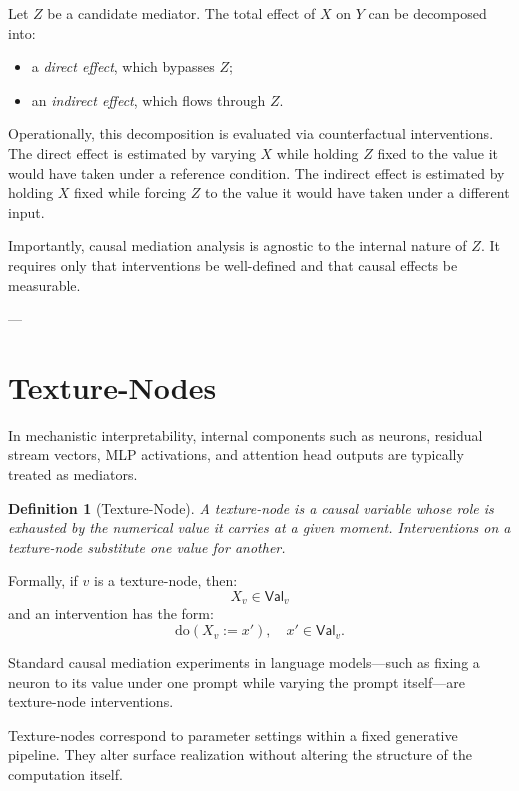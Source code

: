\documentclass[11pt]{article}
\newtheorem{definition}{Definition}
\theoremstyle{remark}
\newcommand{\doop}{\mathrm{do}}
\newcommand{\Val}{\mathsf{Val}}
\begin{document}
Let \(Z\) be a candidate mediator. The total effect of \(X\) on \(Y\) can be decomposed into:
\begin{itemize}
\item a \emph{direct effect}, which bypasses \(Z\);
\item an \emph{indirect effect}, which flows through \(Z\).
\end{itemize}

Operationally, this decomposition is evaluated via counterfactual interventions. The direct effect is estimated by varying \(X\) while holding \(Z\) fixed to the value it would have taken under a reference condition. The indirect effect is estimated by holding \(X\) fixed while forcing \(Z\) to the value it would have taken under a different input.

Importantly, causal mediation analysis is agnostic to the internal nature of \(Z\). It requires only that interventions be well-defined and that causal effects be measurable.

---

\section{Texture-Nodes}

In mechanistic interpretability, internal components such as neurons, residual stream vectors, MLP activations, and attention head outputs are typically treated as mediators.

\begin{definition}[Texture-Node]
A \emph{texture-node} is a causal variable whose role is exhausted by the numerical value it carries at a given moment. Interventions on a texture-node substitute one value for another.
\end{definition}

Formally, if \(v\) is a texture-node, then:
\[
X_v \in \Val_v
\]
and an intervention has the form:
\[
\doop(X_v := x'), \quad x' \in \Val_v.
\]

Standard causal mediation experiments in language models—such as fixing a neuron to its value under one prompt while varying the prompt itself—are texture-node interventions.

Texture-nodes correspond to parameter settings within a fixed generative pipeline. They alter surface realization without altering the structure of the computation itself.
\end{document}
